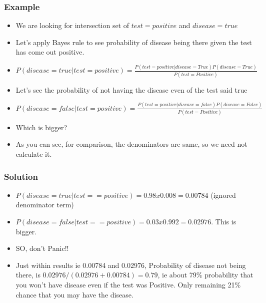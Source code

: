 \begin{frame}[fragile]\frametitle{Example}

\begin{itemize}
\item We are looking for intersection set of $test=positive$ and $disease = true$
\item Let’s apply Bayes rule to see probability of disease being there given the test has come out positive.
\item $P(disease=true|test=positive) = \frac{P(test=positive | disease=True)P(disease=True)}{P(test=Positive)}$
\item Let’s see the probability of not having the disease even of the test said true
\item $P(disease=false|test=positive) = \frac{P(test=positive | disease=false)P(disease=False)}{P(test=Positive)}$
\item Which is bigger?
\item As you can see, for comparison, the denominators are same, so we need not calculate it.

\end{itemize}

\end{frame}


\begin{frame}[fragile]\frametitle{Solution}

\begin{itemize}
\item $P(disease=true|test==positive)= 0.98 x 0.008 = 0.00784$ (ignored denominator term)
\item $P(disease=false|test==positive)= 0.03x 0.992 = 0.02976$. This is bigger. 
\item SO, don’t Panic!!
\item Just within results ie 0.00784 and 0.02976, Probability of disease not being there, is $0.02976/(0.02976+0.00784) = 0.79$, ie about 79\% probability that you won’t have disease even if the test was Positive. Only remaining 21\% chance that you may have the disease.
\end{itemize}

\end{frame}

